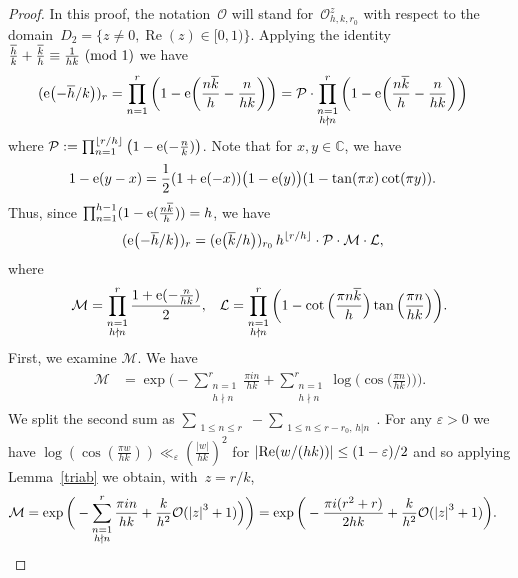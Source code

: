 \documentclass[11pt]{amsart}
\newcommand{\eps}{\varepsilon}
\newcommand{\C}{\mathbb{C}}
\renewcommand{\mod}[1]{~\pr{\textnormal{mod}~#1}}
\theoremstyle{definition}
\newcommand{\ssum}[1]{\sum_{\substack{#1}}}
\newcommand{\pprod}[1]{\prod_{\substack{#1}}}
\newcommand{\pr}[1]{\mathchoice{\left( #1\right)}{(#1)}{(#1)}{(#1)}}
\newcommand{\floor}[1]{{\left\lfloor {#1} \right\rfloor}}
\newcommand{\e}[1][]{\ifthenelse{\equal{#1}{}}{{\rm e}}{\operatorname{e}\pr{ #1}}}
\newcommand{\Oh}{\mathcal{O}}
\renewcommand\Re{\operatorname{Re}}
\newcommand{\1}{{\mathbf 1}}
\newcommand{\abs}[1]{\left|#1\right|}
\let\originalleft\left
\let\originalright\right
\renewcommand{\left}{\mathopen{}\mathclose\bgroup\originalleft}
\renewcommand{\right}{\aftergroup\egroup\originalright}
\numberwithin{equation}{section}
\begin{document}
\begin{proof} In this proof, the notation~$\Oh$ will stand for~$\Oh_{h,k,r_0}^z$ with respect to the domain~$D_2 = \{z\neq 0, \Re(z)\in[0, 1)\}$. 
  Applying the identity $\frac{\overline h}{k}+\frac{\overline k}{h}\equiv \frac{1}{hk}\mod 1$ we have
  \begin{align*}
    (\e[-{\overline h}/k])_{r}&=\prod_{n=1}^r\bigg(1-\e[\frac{n\overline k }h - \frac n{hk}]\bigg)
    = \mathcal{P}\cdot \pprod{n=1\\ h\nmid n}^r\bigg(1-\e[\frac{n\overline k }h - \frac { n}{hk}]\bigg)
  \end{align*}
  where $\mathcal{P}:=\prod_{n=1}^{\lfloor r/h\rfloor}\big(1-\e[-\frac { n}{k}]\big)$. Note that for $x,y\in\C$, we have
  \begin{align*}
    1-\e[y-x]&= \frac{1}2 (1+\e[-x])\big (1-\e[y]\big)(1-\tan (\pi x) \cot (\pi y)).
  \end{align*}
  Thus, since $\prod_{n=1}^{h-1}(1-\e[\frac{n\overline k }h])=h$, we have
  \begin{align}\label{feqr2}
    (\e[-{\overline h}/k])_{r}&=(\e[{\overline k}/h])_{r_0}\, h^{\floor{ r/h}} \cdot \mathcal{P}\cdot \mathcal{M}\cdot \mathcal{L},
  \end{align}
  where 
  \begin{align*}
    \mathcal{M}=\pprod{n=1\\ h\nmid n}^r\frac{1+\e[-\frac{ n}{hk}] }2, &&   \mathcal{L}    =   \pprod{n=1\\ h\nmid n}^r\bigg(1-\cot\Big( \frac{\pi n\overline k }{h} \Big)\tan\Big( \frac { \pi n}{hk} \Big)\bigg).
  \end{align*}
  First, we examine $\mathcal{M}$. We have
  \begin{align*}
    \mathcal{M}&=\exp\bigg(-\ssum{n=1\\ h\nmid n}^r\frac{\pi i n}{hk}+\ssum{n=1\\ h\nmid n}^r\log\Big(\cos\Big(\frac{\pi n}{hk}\Big)\Big)\bigg).
  \end{align*}
  We split the second sum as $\ssum{1\leq n\leq r}-\ssum{1\leq n\leq r-r_0,\, h|n}$. For any $\eps>0$ we have $\log(\cos(\frac{\pi w}{hk}))\ll_\eps (\frac {|w|}{hk})^2$ for $\abs{\Re(w/(hk))}\leq (1-\eps)/2$ and so applying Lemma~\ref{triab} we obtain, with~$z = r/k$,
  \begin{align}\label{bfmm}
    \mathcal{M}&=\exp\bigg(-\ssum{n=1\\ h\nmid n}^r\frac{\pi i n}{hk} + \frac{k}{h^2} \Oh(\abs{z}^3+1) \Big)\bigg)
    = \exp\bigg(-\frac{\pi i (r^2+r)}{2hk}+\frac{k}{h^2}\Oh(\abs{z}^3+1)\bigg).
  \end{align}
  

\end{proof}
\end{document}
